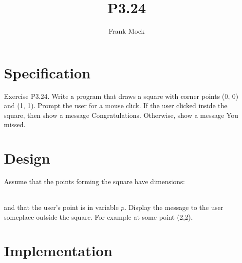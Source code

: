 \documentclass{article}
\title{P3.24}
\author{Frank Mock}
\begin{document}
\maketitle
\section{Specification}
Exercise P3.24.      
Write a program that draws a square with corner points (0, 0) and (1, 1). 
Prompt the user for a mouse click. If the user clicked inside the square, 
then show a message Congratulations. Otherwise, show a message You missed. 
\section{Design}
Assume that the points forming the square have dimensions:\\
\\
and that the user's point is in variable $p$.
Display the message to the user someplace outside the square. For
example at some point (2,2).
\section{Implementation}
\end{document}
